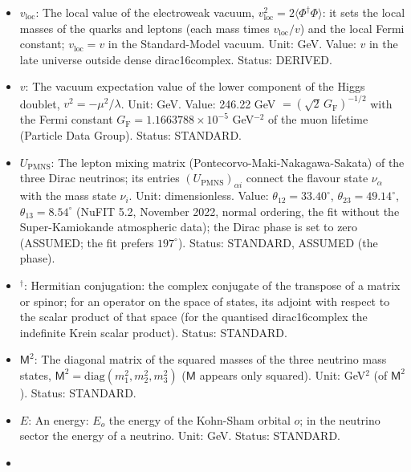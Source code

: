 \documentclass[
  10pt,
]{article}
\begin{document}
\begin{itemize}
  terms (\(3 \times 3\) matrices) of the neutrinos and the antineutrinos
  of momentum \(\vec p\): the rates of change of \(\varrho_{\vec p}\)
  and \(\bar\varrho_{\vec p}\) by emission, absorption, scattering and
  pair processes with the matter. Unit: GeV. Status: STANDARD.
\item
  \(v_{\mathrm{loc}}\): The local value of the electroweak vacuum,
  \(v_{\mathrm{loc}}^2 = 2\langle\Phi^\dagger\Phi\rangle\): it sets the
  local masses of the quarks and leptons (each mass times
  \(v_{\mathrm{loc}}/v\)) and the local Fermi constant;
  \(v_{\mathrm{loc}} = v\) in the Standard-Model vacuum. Unit: GeV.
  Value: \(v\) in the late universe outside dense dirac16complex.
  Status: DERIVED.
\item
  \(v\): The vacuum expectation value of the lower component of the
  Higgs doublet, \(v^2 = -\mu^2/\lambda\). Unit: GeV. Value: 246.22 GeV
  \(= (\sqrt2\,G_{\mathrm{F}})^{-1/2}\) with the Fermi constant
  \(G_{\mathrm{F}} = 1.1663788\times10^{-5}\) GeV\(^{-2}\) of the muon
  lifetime (Particle Data Group). Status: STANDARD.
\item
  \(U_{\mathrm{PMNS}}\): The lepton mixing matrix
  (Pontecorvo-Maki-Nakagawa-Sakata) of the three Dirac neutrinos; its
  entries \((U_{\mathrm{PMNS}})_{\alpha i}\) connect the flavour state
  \(\nu_\alpha\) with the mass state \(\nu_i\). Unit: dimensionless.
  Value: \(\theta_{12} = 33.40^\circ\), \(\theta_{23} = 49.14^\circ\),
  \(\theta_{13} = 8.54^\circ\) (NuFIT 5.2, November 2022, normal
  ordering, the fit without the Super-Kamiokande atmospheric data); the
  Dirac phase is set to zero (ASSUMED; the fit prefers \(197^\circ\)).
  Status: STANDARD, ASSUMED (the phase).
\item
  \({}^\dagger\): Hermitian conjugation: the complex conjugate of the
  transpose of a matrix or spinor; for an operator on the space of
  states, its adjoint with respect to the scalar product of that space
  (for the quantised dirac16complex the indefinite Krein scalar
  product). Status: STANDARD.
\item
  \(\mathsf{M}^2\): The diagonal matrix of the squared masses of the
  three neutrino mass states,
  \(\mathsf{M}^2 = \mathrm{diag}(m_1^2, m_2^2, m_3^2)\) (\(\mathsf{M}\)
  appears only squared). Unit: GeV\(^2\) (of \(\mathsf{M}^2\)). Status:
  STANDARD.
\item
  \(E\): An energy: \(E_o\) the energy of the Kohn-Sham orbital \(o\);
  in the neutrino sector the energy of a neutrino. Unit: GeV. Status:
  STANDARD.
\item

\end{itemize}
\end{document}
